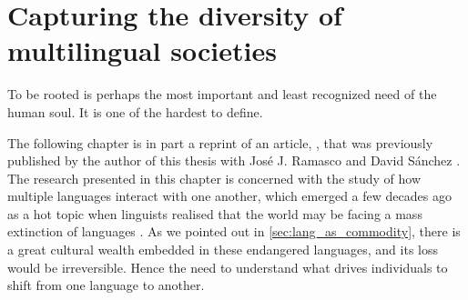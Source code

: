 \documentclass[../thesis.tex]{subfiles}
\begin{document}
\chapter{Capturing the diversity of multilingual societies}
\label{ch:multiling}

\epigraph{
    To be rooted is perhaps the most important and least recognized need of the
    human soul. It is one of the hardest to define.
}{
}

The following chapter is in part a reprint of an article,
, that was previously published by the author of
this thesis with Jos\'{e} J. Ramasco and David S\'{a}nchez
\cite{LoufCapturingDiversity2021}.
\\

The research presented in this chapter is concerned with the study of how multiple
languages interact with one another, which emerged a few decades ago as a hot topic when
linguists realised that the world may be facing a mass extinction of languages
\cite{KraussWorldLanguages1992,GrenobleEndangeredLanguages1998,CrystalLanguageDeath2000}.
As we pointed out in \cref{sec:lang_as_commodity}, there is a great cultural wealth
embedded in these endangered languages, and its loss would be irreversible. Hence
the need to understand what drives individuals to shift from one language to another.
\end{document}
